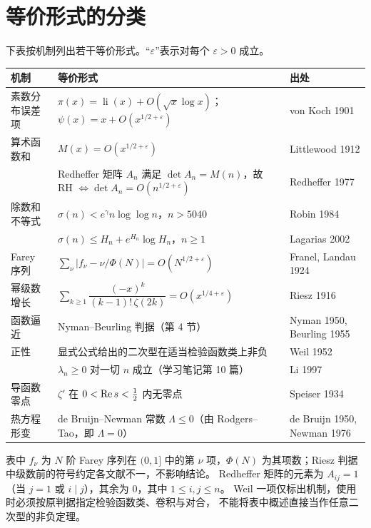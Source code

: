 \documentclass[11pt]{article}
\begin{document}
\section{等价形式的分类}
下表按机制列出若干等价形式。“$\varepsilon$”表示对每个 $\varepsilon>0$ 成立。
\begin{center}
\small
\renewcommand{\arraystretch}{1.25}
\begin{tabular}{>{\raggedright\arraybackslash}p{}>{\raggedright\arraybackslash}p{}>{\raggedright\arraybackslash}p{}}
\toprule
机制 & 等价形式 & 出处\\
\midrule
素数分布误差项 & $\pi(x)=\operatorname{li}(x)+O(\sqrt x\log x)$；$\psi(x)=x+O(x^{1/2+\varepsilon})$ & von Koch 1901\\
算术函数和 & $M(x)=O(x^{1/2+\varepsilon})$ & Littlewood 1912\\
 & Redheffer 矩阵 $A_n$ 满足 $\det A_n=M(n)$，故 RH $\iff\det A_n=O(n^{1/2+\varepsilon})$ & Redheffer 1977\\
除数和不等式 & $\sigma(n)<e^\gamma n\log\log n$，$n>5040$ & Robin 1984\\
 & $\sigma(n)\le H_n+e^{H_n}\log H_n$，$n\ge1$ & Lagarias 2002\\
Farey 序列 & $\sum_{\nu}\bigl|f_\nu-\nu/\Phi(N)\bigr|=O(N^{1/2+\varepsilon})$ & Franel, Landau 1924\\
幂级数增长 & $\sum_{k\ge1}\dfrac{(-x)^k}{(k-1)!\,\zeta(2k)}=O(x^{1/4+\varepsilon})$ & Riesz 1916\\
函数逼近 & Nyman--Beurling 判据（第 4 节） & Nyman 1950, Beurling 1955\\
正性 & 显式公式给出的二次型在适当检验函数类上非负 & Weil 1952\\
 & $\lambda_n\ge0$ 对一切 $n$ 成立（学习笔记第 10 篇） & Li 1997\\
导函数零点 & $\zeta'$ 在 $0<\operatorname{Re} s<\tfrac12$ 内无零点 & Speiser 1934\\
热方程形变 & de Bruijn--Newman 常数 $\Lambda\le0$（由 Rodgers--Tao，即 $\Lambda=0$） & de Bruijn 1950, Newman 1976\\
\bottomrule
\end{tabular}
\end{center}
表中 $f_\nu$ 为 $N$ 阶 Farey 序列在 $(0,1]$ 中的第 $\nu$ 项，$\Phi(N)$ 为其项数；Riesz 判据中级数前的符号约定各文献不一，不影响结论。
Redheffer 矩阵的元素为 $A_{ij}=1$（当 $j=1$ 或 $i\mid j$），其余为 $0$，其中 $1\le i,j\le n$。
Weil 一项仅标出机制，使用时必须按原判据指定检验函数类、卷积与对合，
不能将表中概述直接当作任意二次型的非负定理。
\end{document}
